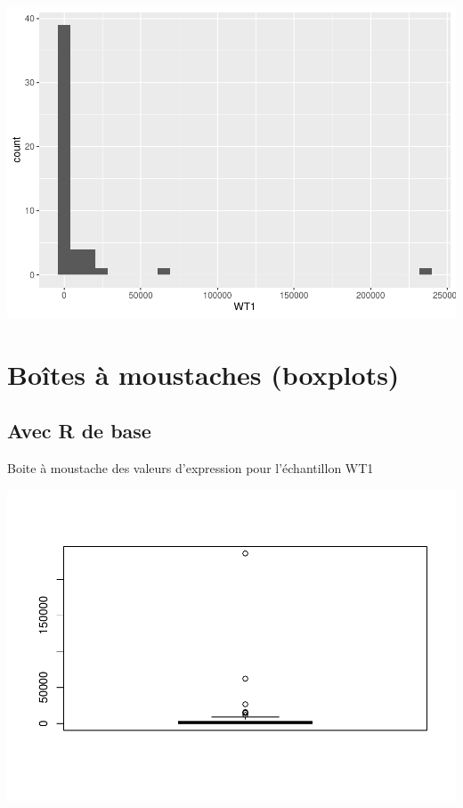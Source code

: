 \documentclass[
]{book}
\newenvironment{Shaded}{\begin{snugshade}}{\end{snugshade}}
\newcommand{\FunctionTok}[1]{\textcolor[rgb]{0.00,0.00,0.00}{#1}}
\newcommand{\NormalTok}[1]{#1}
\newcommand{\SpecialCharTok}[1]{\textcolor[rgb]{0.00,0.00,0.00}{#1}}
\begin{document}
\includegraphics{images/unnamed-chunk-76-1.pdf}

\hypertarget{bouxeetes-uxe0-moustaches-boxplots}{%
\section{Boîtes à moustaches (boxplots)}\label{bouxeetes-uxe0-moustaches-boxplots}}

\hypertarget{avec-r-de-base-1}{%
\subsection{Avec R de base}\label{avec-r-de-base-1}}

Boite à moustache des valeurs d'expression pour l'échantillon WT1

\begin{Shaded}
\end{Shaded}

\includegraphics{images/unnamed-chunk-77-1.pdf}
\end{document}
